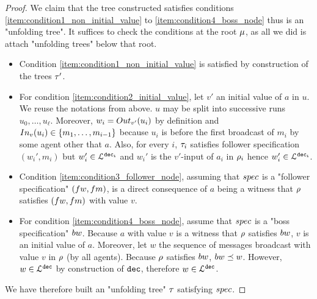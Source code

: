 \begin{proof}
	We claim that the tree constructed satisfies conditions \ref{item:condition1_non_initial_value} to \ref{item:condition4_boss_node} thus is an "unfolding tree". It suffices to check the conditions at the root $\mu$, as all we did is attach "unfolding trees" below that root. 
	\begin{itemize}
	\item Condition \ref{item:condition1_non_initial_value} is satisfied by construction of the trees $\tau'$.
	\item For condition \ref{item:condition2_initial_value}, let $v'$ an initial value of $a$ in $u$. We reuse the notations from above. $u$ may be split into successive runs $u_0, \dots, u_\ell$. Moreover, $w_i  = \voutput{v'}{u_i}$ by definition and $\vinput{v}{u_i} \in \set{m_1,\dots,m_{i-1}}$ because $u_i$ is before the first broadcast of $m_i$ by some agent other that $a$. Also, for every $i$, $\tau_i$ satisfies follower specification $(w_i',m_i)$ but $w_i' \in \mathcal{L}^{\mathtt{\mathtt{dec}_i}}$ and $w_i'$ is the $v'$-input of $a_i$ in $\rho_i$ hence $w_i' \in \mathcal{L}^{\mathtt{\mathtt{dec}_i}}$.
	\item Condition \ref{item:condition3_follower_node}, assuming that $\spec$ is a "follower specification" $(\followwordspec, \followmessagespec)$, is a direct consequence of $a$ being a witness that $\rho$ satisfies $(\followwordspec, \followmessagespec)$ with value $v$. 
	\item For condition \ref{item:condition4_boss_node}, assume that $\spec$ is a "boss specification" $\bossspec$. Because $a$ with value $v$ is a witness that $\rho$ satisfies $\bossspec$, $v$ is an initial value of $a$. Moreover, let $w$ the sequence of messages broadcast with value $v$ in $\rho$ (by all agents). 
	Because $\rho$ satisfies $\bossspec$, $\bossspec \subword w$. However, $w \in \mathcal{L}^{\mathtt{\mathtt{dec}}}$ by construction of $\mathtt{dec}$, therefore $w \in \mathcal{L}^{\mathtt{\mathtt{dec}}}$.
	\end{itemize}

	We have therefore built an "unfolding tree" $\tau$ satisfying $\spec$. 
\end{proof}
